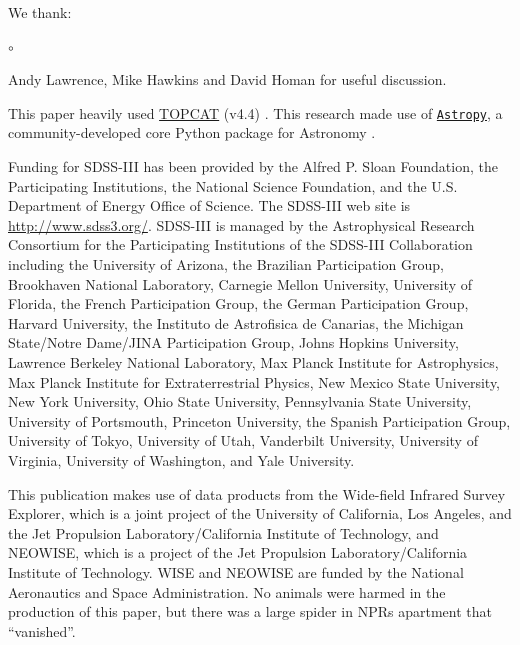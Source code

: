 \documentclass[a4paper,fleqn,usenatbib]{mnras}
\begin{document}
\noindent
We thank:
\begin{list}{$\circ$}{}  
  \item Andy Lawrence, Mike Hawkins and David Homan for useful discussion. 
\end{list}

This paper heavily used \href{http://www.star.bris.ac.uk/~mbt/topcat/}{TOPCAT} (v4.4)
\citep[][]{Taylor2005, Taylor2011}.
This research made use of \href{http://www.astropy.org}{\tt Astropy}, 
a community-developed core Python package for Astronomy 
\citep{AstropyCollaboration2013, AstropyCollaboration2018}.

Funding for SDSS-III has been provided by the Alfred P. Sloan
Foundation, the Participating Institutions, the National Science
Foundation, and the U.S. Department of Energy Office of Science. The
SDSS-III web site is
\href{http://www.sdss3.org/}{http://www.sdss3.org/}.
SDSS-III is managed by the Astrophysical Research Consortium for the
Participating Institutions of the SDSS-III Collaboration including the
University of Arizona, the Brazilian Participation Group, Brookhaven
National Laboratory, Carnegie Mellon University, University of
Florida, the French Participation Group, the German Participation
Group, Harvard University, the Instituto de Astrofisica de Canarias,
the Michigan State/Notre Dame/JINA Participation Group, Johns Hopkins
University, Lawrence Berkeley National Laboratory, Max Planck
Institute for Astrophysics, Max Planck Institute for Extraterrestrial
Physics, New Mexico State University, New York University, Ohio State
University, Pennsylvania State University, University of Portsmouth,
Princeton University, the Spanish Participation Group, University of
Tokyo, University of Utah, Vanderbilt University, University of
Virginia, University of Washington, and Yale University.

This publication makes use of data products from the Wide-field
Infrared Survey Explorer, which is a joint project of the University
of California, Los Angeles, and the Jet Propulsion
Laboratory/California Institute of Technology, and NEOWISE, which is a
project of the Jet Propulsion Laboratory/California Institute of
Technology. WISE and NEOWISE are funded by the National Aeronautics
and Space Administration. No animals were harmed in the production of
this paper, but there was a large spider in NPRs apartment that
``vanished''.





\bsp	%
\label{lastpage}
\end{document}
